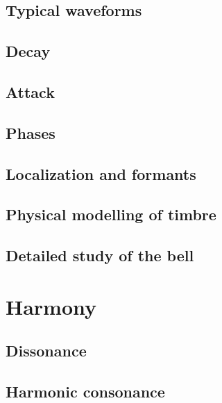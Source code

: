 
\subsection{Typical waveforms}

\subsection{Decay}

\subsection{Attack}

\subsection{Phases}

\subsection{Localization and formants}

\subsection{Physical modelling of timbre}

\subsection{Detailed study of the bell}


\section{Harmony}

\subsection{Dissonance}

\subsection{Harmonic consonance}

